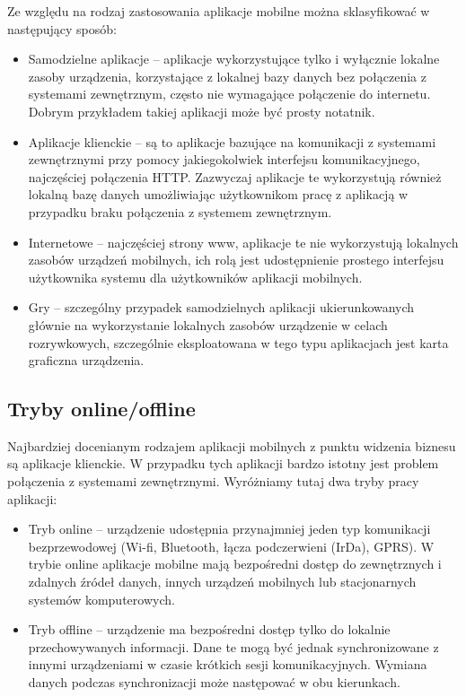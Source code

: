 Ze względu na rodzaj zastosowania aplikacje mobilne można sklasyfikować w następujący sposób:

\begin{itemize}
\item Samodzielne aplikacje -- aplikacje wykorzystujące tylko i wyłącznie lokalne zasoby urządzenia, korzystające z lokalnej bazy danych bez połączenia z systemami zewnętrznym, często nie wymagające połączenie do internetu. Dobrym przykładem takiej aplikacji może być prosty notatnik.  
\item Aplikacje klienckie -- są to aplikacje bazujące na komunikacji z systemami zewnętrznymi przy pomocy jakiegokolwiek interfejsu komunikacyjnego,  najczęściej połączenia HTTP. Zazwyczaj aplikacje te wykorzystują również lokalną bazę danych umożliwiając użytkownikom pracę z aplikacją w przypadku braku połączenia z systemem zewnętrznym.
\item Internetowe -- najczęściej strony www, aplikacje  te nie wykorzystują lokalnych zasobów urządzeń mobilnych, ich rolą jest udostępnienie prostego interfejsu użytkownika systemu dla użytkowników aplikacji mobilnych.
\item Gry  -- szczególny przypadek samodzielnych aplikacji ukierunkowanych głównie na wykorzystanie lokalnych zasobów urządzenie w celach rozrywkowych, szczególnie eksploatowana w tego typu aplikacjach jest karta graficzna urządzenia.
\end{itemize}

\subsection{Tryby online/offline}
\label{sec:trybyAplikacjiMobilnych}

Najbardziej docenianym rodzajem aplikacji mobilnych z punktu widzenia biznesu są aplikacje klienckie. W przypadku tych aplikacji bardzo istotny jest problem połączenia z systemami zewnętrznymi. Wyróżniamy tutaj dwa tryby pracy aplikacji:

\begin{itemize}
\item Tryb online -- urządzenie udostępnia przynajmniej jeden typ komunikacji bezprzewodowej (Wi-fi, Bluetooth, łącza podczerwieni (IrDa), GPRS). W trybie online aplikacje mobilne mają bezpośredni dostęp do zewnętrznych i zdalnych źródeł danych, innych urządzeń mobilnych lub stacjonarnych systemów komputerowych.   
\item Tryb offline -- urządzenie ma bezpośredni dostęp tylko do lokalnie przechowywanych informacji. Dane te mogą być jednak synchronizowane z innymi urządzeniami w czasie krótkich sesji komunikacyjnych. Wymiana danych podczas synchronizacji może następować w obu kierunkach. 
\end{itemize}

